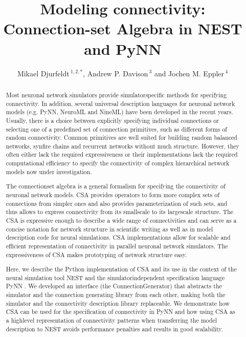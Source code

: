 \documentclass{frontiersSCNS} %
\def\firstAuthorLast{Djurfeldt {et~al.}}
\def\Authors{Mikael Djurfeldt\,$^{1,2,*}$, Andrew P. Davison\,$^{3}$
  and Jochen M. Eppler\,$^4$}
\begin{document}
\onecolumn
{}

\title[CSA in NEST and PyNN]{Modeling connectivity: Connection-set Algebra in NEST and PyNN}
\author[\firstAuthorLast ]{\Authors}
\address{}
\correspondance{}
\extraAuth{}%

\maketitle
\begin{abstract}

Most neuronal network simulators provide simulator­specific methods
for specifying connectivity.  In addition, several universal
description languages for neuronal network models (e.g. PyNN,
NeuroML and NineML) have been developed in the recent
years. Usually, there is a choice between explicitly specifying
individual connections or selecting one of a predefined set of
connection primitives, such as different forms of random
connectivity. Common primitives are well suited for building random
balanced networks, synfire chains and recurrent networks without
much structure. However, they often either lack the required
expressiveness or their implementations lack the required
computational efficiency to specify the connectivity of complex
hierarchical network models now under investigation.

The connection­set algebra \citep[CSA;][]{djurfeldt12} is a general
formalism for specifying the connectivity of neuronal network
models. CSA provides operators to form more complex sets of
connections from simpler ones and also provides parameterization of
such sets, and thus allows to express connectivity from its
small­scale to its large­scale structure. The CSA is expressive
enough to describe a wide range of connectivities and can serve as a
concise notation for network structure in scientific writing as well
as in model description code for neural simulations. CSA
implementations allow for scalable and efficient representation of
connectivity in parallel neuronal network simulators. The
expressiveness of CSA makes prototyping of network structure easy.

Here, we describe the Python implementation of CSA and its use in
the context of the neural simulation tool NEST
\citep{Gewaltig_07_11204} and the simulator­independent
specification language PyNN \citep{Davison09}. We developed an
interface (the ConnectionGenerator) that abstracts the simulator and
the connection generating library from each other, making both the
simulator and the connectivity description library replaceable. We
demonstrate how CSA can be used for the specification of
connectivity in PyNN and how using CSA as a high­level
representation of connectivity patterns when transferring the model
description to NEST avoids performance penalties and results in good
scalability.


\end{abstract}
\end{document}
